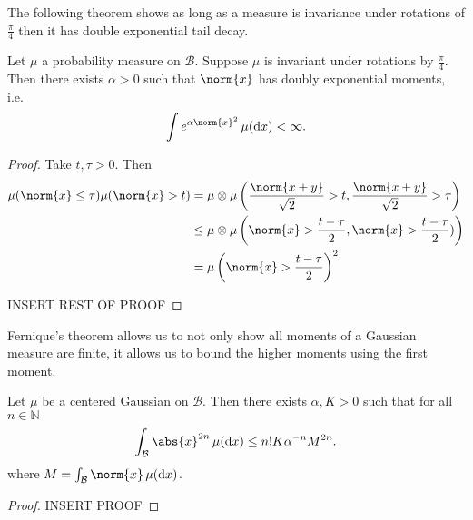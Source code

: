\documentclass[fontsize=12pt, DIV=10]{scrreprt}
\theoremstyle{remark}
\newcommand{\N}{\mathbb N}
\newcommand{\calB}{\mathcal B}
\newcommand{\dif}[1]{\text{d} #1}
\begin{document}
The following theorem shows as long as a measure is invariance under rotations of $\frac{\pi}{4}$ then it has double exponential tail decay.
\begin{theorem}[Fernique]
	Let $\mu$ a probability measure on $\calB$. Suppose $\mu$ is invariant under rotations by $\frac{\pi}{4}$. Then there exists $\alpha > 0$ such that $\norm{x}$ has doubly exponential moments, i.e.\
	\begin{equation}
		\int e^{\alpha \norm{x}^2} \, \mu(\dif x) < \infty.
	\end{equation}
\end{theorem}
\begin{proof}
	Take $t, \tau > 0$. Then
	\begin{align}
		\mu(\norm{x} \leq \tau) \mu(\norm{x} > t)
		&= \mu \otimes \mu\left( \frac{\norm{x + y}}{\sqrt{2}} > t, \frac{\norm{x+y}}{\sqrt{2}} > \tau \right) \\
		&\leq \mu \otimes \mu \left(\norm{x} > \frac{t - \tau}{2}, \norm{x} > \frac{t - \tau}{2}) \right) \\
		&= \mu\left(\norm{x} > \frac{t - \tau}{2}\right)^2
	\end{align}

	INSERT REST OF PROOF
\end{proof}

Fernique's theorem allows us to not only show all moments of a Gaussian measure are finite, it allows us to bound the higher moments using the first moment.

\begin{prop}
	\label{prop:bounded-moments}
	Let $\mu$ be a centered Gaussian on $\calB$. Then there exists $\alpha, K > 0$ such that for all $n \in \N$
	\begin{equation}
		\int_{\calB} \abs{x}^{2n} \, \mu(\dif x) \leq n! K \alpha^{-n} M^{2n}.
	\end{equation}
	where $M = \int_{\calB} \norm{x} \, \mu(\dif x)$.
\end{prop}
\begin{proof}
	INSERT PROOF
\end{proof}
\end{document}
